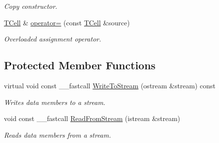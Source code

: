 \begin{DoxyCompactItemize}
\begin{DoxyCompactList}\small\item\em Copy constructor. \end{DoxyCompactList}\item 
\hypertarget{class_t_cell_a440399879aa0643cf8d72b5137c6937f}{\hyperlink{class_t_cell}{T\+Cell} \& \hyperlink{class_t_cell_a440399879aa0643cf8d72b5137c6937f}{operator=} (const \hyperlink{class_t_cell}{T\+Cell} \&source)}\label{class_t_cell_a440399879aa0643cf8d72b5137c6937f}

\begin{DoxyCompactList}\small\item\em Overloaded assignment operator. \end{DoxyCompactList}\end{DoxyCompactItemize}
\subsection*{Protected Member Functions}
\begin{DoxyCompactItemize}
\item 
\hypertarget{class_t_cell_a30a737eed36e2927d8889f913e3a4c3a}{virtual void const \+\_\+\+\_\+fastcall \hyperlink{class_t_cell_a30a737eed36e2927d8889f913e3a4c3a}{Write\+To\+Stream} (ostream \&stream) const }\label{class_t_cell_a30a737eed36e2927d8889f913e3a4c3a}

\begin{DoxyCompactList}\small\item\em Writes data members to a stream. \end{DoxyCompactList}\item 
\hypertarget{class_t_cell_a9d7aacc69150c73ce6f3a0773cb2ae2e}{void const \+\_\+\+\_\+fastcall \hyperlink{class_t_cell_a9d7aacc69150c73ce6f3a0773cb2ae2e}{Read\+From\+Stream} (istream \&stream)}\label{class_t_cell_a9d7aacc69150c73ce6f3a0773cb2ae2e}

\begin{DoxyCompactList}\small\item\em Reads data members from a stream. \end{DoxyCompactList}\end{DoxyCompactItemize}

